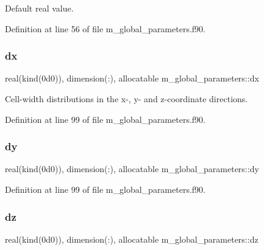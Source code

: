 Default real value. 



Definition at line 56 of file m\+\_\+global\+\_\+parameters.\+f90.

\mbox{\label{namespacem__global__parameters_ac96de935d1ac1a172537dfcba610b976}} 
\subsubsection{\texorpdfstring{dx}{dx}}
{\footnotesize\ttfamily real(kind(0d0)), dimension(\+:), allocatable m\+\_\+global\+\_\+parameters\+::dx}



Cell-\/width distributions in the x-\/, y-\/ and z-\/coordinate directions. 



Definition at line 99 of file m\+\_\+global\+\_\+parameters.\+f90.

\mbox{\label{namespacem__global__parameters_abeca739b09557ccbf37b2ec35b0e73cc}} 
\subsubsection{\texorpdfstring{dy}{dy}}
{\footnotesize\ttfamily real(kind(0d0)), dimension(\+:), allocatable m\+\_\+global\+\_\+parameters\+::dy}



Definition at line 99 of file m\+\_\+global\+\_\+parameters.\+f90.

\mbox{\label{namespacem__global__parameters_a30d96803eb46c67ff4f0f1d7c7b92a37}} 
\subsubsection{\texorpdfstring{dz}{dz}}
{\footnotesize\ttfamily real(kind(0d0)), dimension(\+:), allocatable m\+\_\+global\+\_\+parameters\+::dz}



